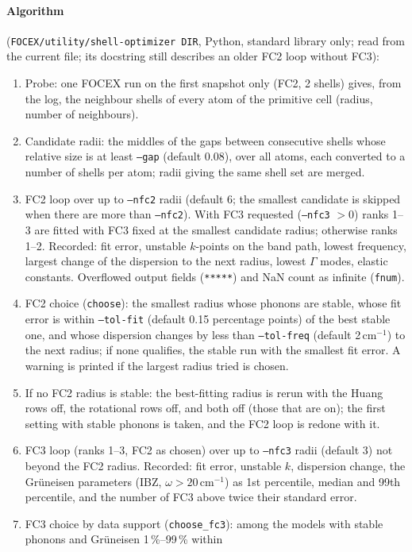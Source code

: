 \documentclass[11pt,a4paper]{article}
\newcommand{\code}[1]{\texttt{#1}}
\begin{document}
\paragraph{Algorithm} (\code{FOCEX/utility/shell-optimizer DIR}, Python, standard library only; read from the current
file; its docstring still describes an older FC2 loop without FC3):
\begin{enumerate}
\item Probe: one FOCEX run on the first snapshot only (FC2, 2 shells) gives, from the log, the neighbour shells of every
atom of the primitive cell (radius, number of neighbours).
\item Candidate radii: the middles of the gaps between consecutive shells whose relative size is at least \code{--gap}
(default 0.08), over all atoms, each converted to a number of shells per atom; radii giving the same shell set are
merged.
\item FC2 loop over up to \code{--nfc2} radii (default 6; the smallest candidate is skipped when there are more than
\code{--nfc2}). With FC3 requested (\code{--nfc3} $>0$) ranks 1--3 are fitted with FC3 fixed at the smallest candidate
radius; otherwise ranks 1--2. Recorded: fit error, unstable $k$-points on the band path, lowest frequency, largest
change of the dispersion to the next radius, lowest $\Gamma$ modes, elastic constants. Overflowed output fields
(\code{*****}) and NaN count as infinite (\code{fnum}).
\item FC2 choice (\code{choose}): the smallest radius whose phonons are stable, whose fit error is within \code{--tol-fit}
(default 0.15 percentage points) of the best stable one, and whose dispersion changes by less than \code{--tol-freq}
(default 2\,cm$^{-1}$) to the next radius; if none qualifies, the stable run with the smallest fit error. A warning is
printed if the largest radius tried is chosen.
\item If no FC2 radius is stable: the best-fitting radius is rerun with the Huang rows off, the rotational rows off,
and both off (those that are on); the first setting with stable phonons is taken, and the FC2 loop is redone with it.
\item FC3 loop (ranks 1--3, FC2 as chosen) over up to \code{--nfc3} radii (default 3) not beyond the FC2 radius. Recorded:
fit error, unstable $k$, dispersion change, the Gr\"uneisen parameters (IBZ, $\omega>20$\,cm$^{-1}$) as 1st percentile,
median and 99th percentile, and the number of FC3 above twice their standard error.
\item FC3 choice by data support (\code{choose\_fc3}): among the models with stable phonons and Gr\"uneisen 1\,\%--99\,\% within

\end{enumerate}
\end{document}
